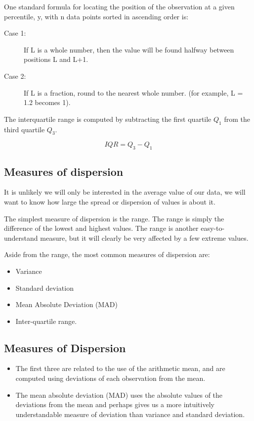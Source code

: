 \documentclass[]{report}
\begin{document}
One standard formula for locating the position of the observation at a given percentile, y, 
with n data points sorted in ascending order is:

\begin{description}
\item[Case 1:] If L is a whole number, then the value will be found halfway between positions L and L+1. 
\item[Case 2:] If L is a fraction, round to the nearest whole number. (for example, L = 1.2 becomes 1). 
\end{description}


The interquartile range is computed by subtracting the first quartile $Q_1$ from the third quartile $Q_3$.

\[ IQR = Q_3 - Q_1 \]













\subsection{Measures of dispersion}
It is unlikely we will only be interested in the average value of our data, we will want
to know how large the spread or dispersion of values is about it. 

\noindent The simplest measure of dispersion is the range.
The range is simply the difference of the lowest and highest values. The range is
another easy-to-understand measure, but it will clearly be very affected by a few
extreme values.

\noindent Aside from the range, the most common measures of dispersion are:
\begin{itemize}
\item Variance
\item Standard deviation
\item Mean Absolute Deviation (MAD)
\item Inter-quartile range.
\end{itemize}
\noindent 


\subsection{Measures of Dispersion}
\begin{itemize}
\item The first three are related to the use of the arithmetic mean, and are computed using deviations of each observation from the mean.
\item The mean absolute deviation (MAD) uses the absolute values of the deviations from
the mean and perhaps gives us a more intuitively understandable measure of deviation than
variance and standard deviation.
\end{itemize} 
\end{document}
